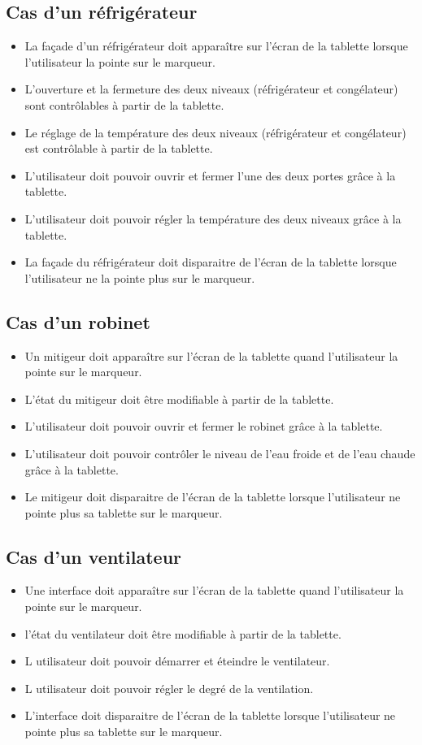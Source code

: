 \documentclass[12pt,a4paper]{article}
\begin{document}
\subsection{Cas d'un réfrigérateur}
\begin{itemize} 
 \item La façade d'un réfrigérateur doit apparaître sur l'écran de la tablette lorsque l'utilisateur la pointe sur le marqueur.
 \item L'ouverture et la fermeture des deux niveaux (réfrigérateur et congélateur) sont contrôlables à partir de la tablette.
 \item Le réglage de la température des deux niveaux (réfrigérateur et congélateur) est contrôlable à partir de la tablette.
 \item L'utilisateur doit pouvoir ouvrir et fermer l'une des deux portes grâce à la tablette.
 \item L'utilisateur doit pouvoir régler la température des deux niveaux grâce à la tablette.
 \item La façade du réfrigérateur doit disparaitre de l'écran de la tablette lorsque l'utilisateur ne la pointe plus sur le marqueur.
\end{itemize}

\subsection{Cas d'un robinet}
\begin{itemize} 
  \item Un mitigeur doit apparaître sur l'écran de la tablette quand l'utilisateur la pointe sur le marqueur.
  \item L'état du mitigeur doit être modifiable à partir de la tablette.
  \item L'utilisateur doit pouvoir ouvrir et fermer le robinet grâce à la tablette.
  \item L'utilisateur doit pouvoir contrôler le niveau de l'eau froide et de l'eau chaude grâce à la tablette.
  \item Le mitigeur doit disparaitre de l'écran de la tablette lorsque l'utilisateur ne pointe plus sa tablette sur le marqueur.
\end{itemize}

\subsection{Cas d'un ventilateur}
\begin{itemize} 
  \item Une interface doit apparaître sur l'écran de la tablette quand l'utilisateur la pointe sur le marqueur.
  \item l'état du ventilateur doit être modifiable à partir de la tablette. 
  \item L utilisateur doit pouvoir démarrer et éteindre le ventilateur. 
  \item L utilisateur doit pouvoir régler le degré de la ventilation.
  \item L'interface doit disparaitre de l'écran de la tablette lorsque l'utilisateur ne pointe plus sa tablette sur le marqueur.
\end{itemize}
\end{document}
